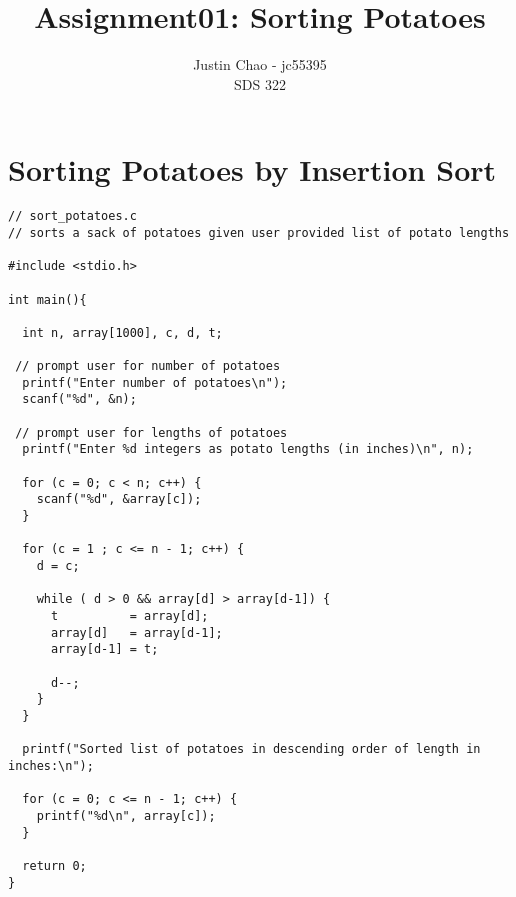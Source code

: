 \documentclass{article}
\begin{document}
\title {Assignment01: Sorting Potatoes}
\author {Justin Chao - jc55395 \\ SDS 322}
\maketitle

\section*{Sorting Potatoes by Insertion Sort}

\begin{lstlisting}
// sort_potatoes.c
// sorts a sack of potatoes given user provided list of potato lengths

#include <stdio.h>

int main(){

  int n, array[1000], c, d, t;

 // prompt user for number of potatoes 
  printf("Enter number of potatoes\n");
  scanf("%d", &n);

 // prompt user for lengths of potatoes 
  printf("Enter %d integers as potato lengths (in inches)\n", n);
 
  for (c = 0; c < n; c++) {
    scanf("%d", &array[c]);
  }
 
  for (c = 1 ; c <= n - 1; c++) {
    d = c;
 
    while ( d > 0 && array[d] > array[d-1]) {
      t          = array[d];
      array[d]   = array[d-1];
      array[d-1] = t;
 
      d--;
    }
  }
 
  printf("Sorted list of potatoes in descending order of length in inches:\n");
 
  for (c = 0; c <= n - 1; c++) {
    printf("%d\n", array[c]);
  }

  return 0;
}
\end{lstlisting}
\end{document}
